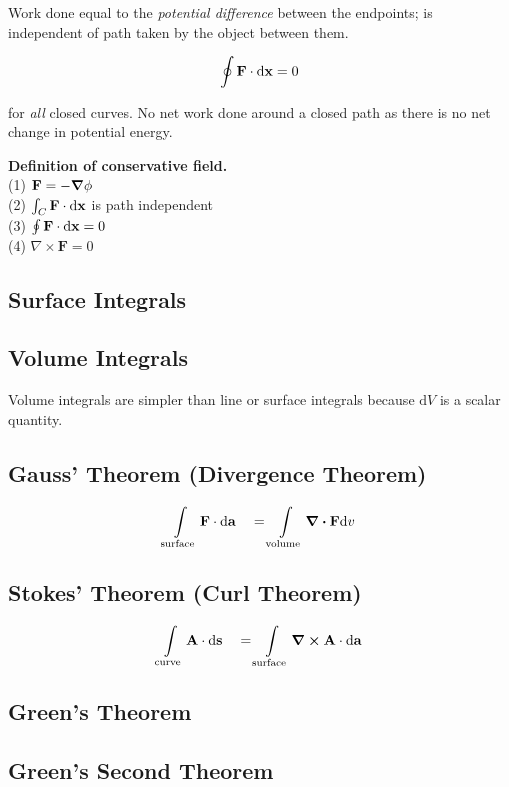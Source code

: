  Work done equal to the \textit{potential difference} between the endpoints; is independent of path taken by the object between them. 
 
 $$\oint \mathbf{F} \cdot \differential \mathbf{x} = 0$$
 
 for \textit{all} closed curves. No net work done around a closed path as there is no net change in potential energy.
 
 \textbf{Definition of conservative field.} \\
 (1) $\mathbf{F} = -\grad \phi$ \\
 (2) $\int_C \mathbf{F} \cdot \differential \mathbf{x}$ is path independent \\
 (3) $\oint \mathbf{F} \cdot \differential \mathbf{x} = 0$ \\
 (4) $\nabla \times \mathbf{F} = 0$

\subsection*{Surface Integrals}
\subsection*{Volume Integrals}
Volume integrals are simpler than line or surface integrals because $\mathrm{d}V$ is a scalar quantity.

\subsection*{Gauss' Theorem (Divergence Theorem)}
\begin{equation*}
    \int\limits_{\mathrm{surface}} \mathbf{F} \cdot \differential \mathbf{a} \quad = \int\limits_{\mathrm{volume}} \divergence \mathbf{F} \differential v
\end{equation*}
\subsection*{Stokes' Theorem (Curl Theorem)}
\begin{equation*}
    \int\limits_{\mathrm{curve}} \mathbf{A} \cdot \differential \mathbf{s} \quad = \int\limits_{\mathrm{surface}} \curl \mathbf{A} \cdot \differential \mathbf{a}
\end{equation*}
\subsection*{Green's Theorem}
\subsection*{Green's Second Theorem}
